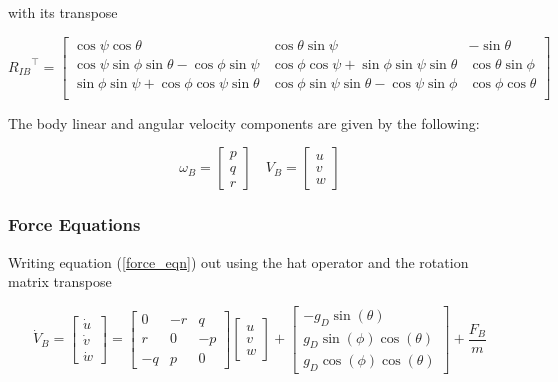 with its transpose

\begin{equation*}
  {R_{IB}}^{\top}=
  \begin{bmatrix}
    \cos{\psi}\cos{\theta} &  \cos{\theta}\sin{\psi} & -\sin{\theta} \\
    \cos{\psi}\sin{\phi}\sin{\theta}-\cos{\phi}\sin{\psi} & \cos{\phi}\cos{\psi}+\sin{\phi}\sin{\psi}\sin{\theta} & \cos{\theta}\sin{\phi} \\
    \sin{\phi}\sin{\psi}+\cos{\phi}\cos{\psi}\sin{\theta} & \cos{\phi}\sin{\psi}\sin{\theta}-\cos{\psi}\sin{\phi} & \cos{\phi}\cos{\theta} \\
  \end{bmatrix}
\end{equation*}

The body linear and angular velocity components are given by the following:

\begin{equation*}
  \omega_{B}=
  \begin{bmatrix}
    p \\
    q \\
    r
  \end{bmatrix}
  \quad
  V_{B}=
  \begin{bmatrix}
    u \\
    v \\
    w
  \end{bmatrix}
\end{equation*}

\subsubsection{Force Equations}

Writing equation (\ref{force_eqn}) out using the hat operator and the rotation matrix transpose

\begin{equation}
  \label{force3_eqn}
  \dot{V}_{B}=
  \begin{bmatrix}
    \dot{u} \\
    \dot{v} \\
    \dot{w}
  \end{bmatrix} =
  \begin{bmatrix}
    0 & -r & q \\
    r & 0 & -p \\
    -q & p & 0
  \end{bmatrix}
  \begin{bmatrix}
    u \\
    v \\
    w
  \end{bmatrix}+
  \begin{bmatrix}
    -g_{D}\sin(\theta) \\
    g_{D}\sin(\phi)\cos(\theta) \\
    g_{D}\cos(\phi)\cos(\theta)
  \end{bmatrix}+
  \frac{F_{B}}{m}
\end{equation}

